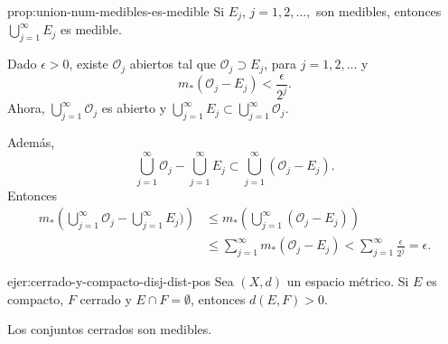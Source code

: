 \begin{proposicion}{prop:union-num-medibles-es-medible}
Si $E_j$, $j=1,2,\ldots,$ son medibles, entonces $\bigcup\limits_{j=1}^{\infty} E_j$ 
es medible.
\end{proposicion}

\begin{demo}
Dado $\epsilon>0$, existe $\mathcal{O}_j$ abiertos tal que $\mathcal{O}_j\supset E_j$, para $j=1,2,\dots$
y 
\[
m_{*}(\mathcal{O}_j-E_j)<\frac{\epsilon}{2^j}.
\]
Ahora, $\bigcup\limits_{j=1}^{\infty} \mathcal{O}_j$ es abierto y $\bigcup\limits_{j=1}^{\infty} E_j \subset \bigcup\limits_{j=1}^{\infty} \mathcal{O}_j$.

Adem\'as, 
\[
\bigcup\limits_{j=1}^{\infty} \mathcal{O}_j-\bigcup\limits_{j=1}^{\infty} E_j
\subset
\bigcup\limits_{j=1}^{\infty}\left( \mathcal{O}_j- E_j\right).
\]
Entonces
\[
\begin{split}
m_{*}\left(\bigcup\limits_{j=1}^{\infty} \mathcal{O}_j-\bigcup\limits_{j=1}^{\infty} E_j)\right)
&\leq
m_{*}\left(\bigcup\limits_{j=1}^{\infty}\left( \mathcal{O}_j- E_j\right)\right)
\\
&\leq 
\sum\limits_{j=1}^{\infty} m_{*}\left( \mathcal{O}_j- E_j\right)<
\sum\limits_{j=1}^{\infty} \frac{\epsilon}{2^j}=
\epsilon.
\end{split}
\]
\end{demo}

\begin{ejercicio}{ejer:cerrado-y-compacto-disj-dist-pos}
Sea $(X,d)$ un espacio m\'etrico. Si $E$ es compacto, $F$ cerrado y $E\cap F=\emptyset$, entonces $d(E,F)>0$.
\end{ejercicio}

\begin{proposicion}{}
Los conjuntos cerrados son medibles.
\end{proposicion}

